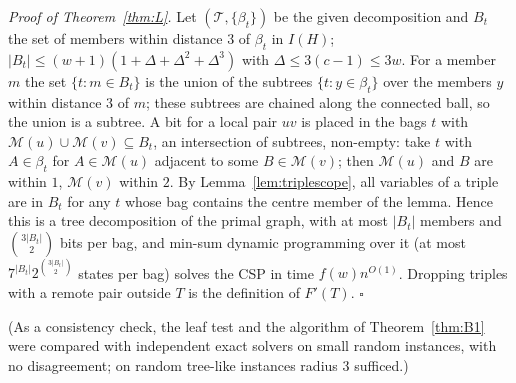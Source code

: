 \emph{Proof of Theorem~\ref{thm:L}.} Let $(\mathcal T,\{\beta_t\})$ be the given decomposition and $B_t$ the set of members within distance $3$ of $\beta_t$ in $I(H)$; $|B_t|\le(w+1)(1+\Delta+\Delta^2+\Delta^3)$ with $\Delta\le3(c-1)\le3w$. For a member $m$ the set $\{t:m\in B_t\}$ is the union of the subtrees $\{t:y\in\beta_t\}$ over the members $y$ within distance $3$ of $m$; these subtrees are chained along the connected ball, so the union is a subtree. A bit for a local pair $uv$ is placed in the bags $t$ with $\mathcal M(u)\cup\mathcal M(v)\subseteq B_t$, an intersection of subtrees, non-empty: take $t$ with $A\in\beta_t$ for $A\in\mathcal M(u)$ adjacent to some $B\in\mathcal M(v)$; then $\mathcal M(u)$ and $B$ are within $1$, $\mathcal M(v)$ within $2$. By Lemma~\ref{lem:triplescope}, all variables of a triple are in $B_t$ for any $t$ whose bag contains the centre member of the lemma. Hence this is a tree decomposition of the primal graph, with at most $|B_t|$ members and $\binom{3|B_t|}2$ bits per bag, and min-sum dynamic programming over it (at most $7^{|B_t|}2^{\binom{3|B_t|}{2}}$ states per bag) solves the CSP in time $f(w)n^{O(1)}$. Dropping triples with a remote pair outside $T$ is the definition of $F'(T)$. \hfill$\square$

(As a consistency check, the leaf test and the algorithm of Theorem~\ref{thm:B1} were compared with independent exact solvers on small random instances, with no disagreement; on random tree-like instances radius $3$ sufficed.)

